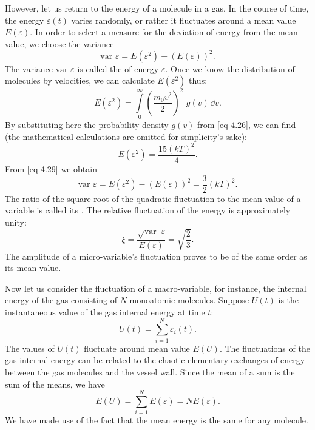 However, let us return to the energy of a molecule in a gas. In the course of time, the energy $\varepsilon (t)$ varies randomly, or rather it fluctuates around a mean value $E(\varepsilon)$. In order to select a measure for the deviation of energy from the mean value, we choose the variance
\begin{equation}%
\textrm{var} \,\, \varepsilon = E(\varepsilon^{2})  - ( E(\varepsilon))^{2}.
\label{eq-4.32}
\end{equation}
The variance $\textrm{var} \,\, \varepsilon$ is called the  of energy $\varepsilon$. Once we know the distribution of molecules by velocities, we can calculate $E(\varepsilon^{2}) $ thus:
\begin{equation}%
 E(\varepsilon^{2})  = \int\limits_{0}^{\infty} \left( \frac{m_{0} v^{2}}{2} \right)^{2} \,\, g(v) \, \dd v.
\label{eq-4.33}
\end{equation}
By substituting here the probability density $g (v)$ from \eqref{eq-4.26}, we can find (the mathematical calculations are omitted for simplicity's sake):
\begin{equation}%
E(\varepsilon^{2}) = \frac{15(kT)^{2}}{4}.
\label{eq-4.34}
\end{equation}
From \eqref{eq-4.29} we obtain
\begin{equation}%
\textrm{var} \,\, \varepsilon = E(\varepsilon^{2})  - ( E(\varepsilon))^{2} = \frac{3}{2} (kT)^{2}.
\label{eq-4.35}
\end{equation}
The ratio of the square root of the quadratic fluctuation to the mean value of a variable is called its . The relative fluctuation of the energy is approximately unity:
\begin{equation}%
\xi = \frac{\sqrt{\textrm{var}} \,\, \varepsilon }{ E(\varepsilon)} = \sqrt{\frac{2}{3}}.
\label{eq-4.36}
\end{equation}
The amplitude of a micro-variable's fluctuation proves to be of the same order as its mean value.

Now let us consider the fluctuation of a macro-variable, for instance, the internal energy of the gas consisting of $N$ monoatomic molecules. Suppose $U (t)$ is the instantaneous value of the gas internal energy at time $t$:
\begin{equation}%
U(t) = \sum^{N}_{i =1} \varepsilon_{i} (t). 
\label{eq-4.37}
\end{equation}
The values of $U (t)$ fluctuate around mean value $E (U)$. The fluctuations of the gas internal energy can be related to the chaotic elementary exchanges of energy between the gas molecules and the vessel wall. Since the mean of a sum is the sum of the means, we have
\begin{equation}%
E(U) = \sum^{N}_{i =1} E(\varepsilon) = NE(\varepsilon).
\label{eq-4.38}
\end{equation}
We have made use of the fact that the mean energy is the same for any molecule.

